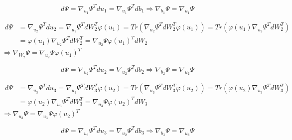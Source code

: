 \documentclass[12pt]{scrartcl}
\begin{document}
$$d\Psi = \nabla_{u_1}\Psi^Tdu_1 = \nabla_{u_1}\Psi^T db_1 \Rightarrow \nabla_{b_1}\Psi = \nabla_{u_1} \Psi$$
\begin{center}
\end{center}

\begin{align*}
d\Psi &= \nabla_{u_2}\Psi^Tdu_2 = \nabla_{u_2}\Psi^T dW_2^T\varphi(u_1) = Tr(\nabla_{u_2}\Psi^T dW_2^T\varphi(u_1)) =
Tr(\varphi(u_1)\nabla_{u_2}\Psi^T dW_2^T)\\
&= \varphi(u_1)\nabla_{u_2}\Psi^T dW_2^T = \nabla_{u_2}\Psi\varphi(u_1)^T dW_2
\end{align*}
$\Rightarrow \nabla_{W_2}\Psi = \nabla_{u_2}\Psi\varphi(u_1)^T$
\begin{center}
\end{center}

$$d\Psi = \nabla_{u_2}\Psi^Tdu_2 = \nabla_{u_2}\Psi^T db_2 \Rightarrow \nabla_{b_2}\Psi = \nabla_{u_2} \Psi$$
\begin{center}
\end{center}

\begin{align*}
d\Psi &= \nabla_{u_3}\Psi^Tdu_3 = \nabla_{u_3}\Psi^TdW_3^T\varphi(u_2) = Tr(\nabla_{u_3}\Psi^TdW_3^T\varphi(u_2))
= Tr(\varphi(u_2)\nabla_{u_3}\Psi^TdW_3^T)\\
&= \varphi(u_2)\nabla_{u_3}\Psi^TdW_3^T
= \nabla_{u_3}\Psi \varphi(u_2)^T dW_3
\end{align*}
$\Rightarrow \nabla_{u_3}\Psi = \nabla_{u_3}\Psi \varphi(u_2)^T$
\begin{center}
\end{center}

$$d\Psi = \nabla_{u_3}\Psi^Tdu_3 = \nabla_{u_2}\Psi^T db_3 \Rightarrow \nabla_{b_3}\Psi = \nabla_{u_3} \Psi$$
\begin{center}
\end{center}
\end{document}
